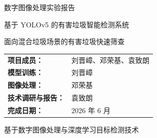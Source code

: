 \documentclass[UTF8,a4paper,12pt]{ctexart}
\begin{document}
\begin{titlepage}
  \centering
  \vspace*{2.2cm}
  {\heiti{} 数字图像处理实验报告\par}
  \vspace{1.1cm}
  {\heiti{} 基于 YOLOv5 的有害垃圾智能检测系统\par}
  \vspace{0.5cm}
  {\Large 面向混合垃圾场景的有害垃圾快速筛查\par}
  \vfill
  \renewcommand{\arraystretch}{1.8}
  \begin{tabular}{>{\bfseries}p{3.5cm}p{7cm}}
    项目成员： & 刘晋嶂、邓荣基、袁致朗 \\
    模型训练： & 刘晋嶂 \\
    图像处理： & 邓荣基 \\
    技术调研与报告： & 袁致朗 \\
    完成日期： & 2026 年 6 月 \\
  \end{tabular}
  \vfill
  {\large 基于数字图像处理与深度学习目标检测技术\par}
\end{titlepage}

\begin{abstract}
在生活垃圾收集、转运和分拣过程中，干电池、过期药品、药膏及其他具有毒性、腐蚀性或潜在环境危害的物品，可能被混入大量普通垃圾。若这些有害垃圾未在前端及时识别并分离，它们可能进入压缩、破碎、焚烧、填埋或资源化利用等后续环节，造成有害物质泄漏、设备污染和二次环境风险。与此同时，环卫工人面对的通常不是背景干净、摆放规则的单件垃圾，而是数量庞大、相互遮挡且外观复杂的混合垃圾，单纯依靠人工逐件检查效率低、劳动强度高，并可能增加直接接触风险。

本项目围绕上述现实问题，设计并实现了一套基于 YOLOv5s 的垃圾目标检测系统。系统首先使用数字图像处理流水线对上传图像进行尺寸归一化、Gaussian Blur 去噪、CLAHE 局部对比度增强及 Unsharp Masking 锐化，再由 YOLOv5s 对图像中的垃圾进行分类与定位。当检测结果中出现干电池、过期药品、药膏、充电宝和化妆品瓶等有害垃圾时，Web 前端会进行醒目提示。实验采用开源且已完成目标框标注的垃圾图像数据集进行迁移学习，最终模型在验证集上获得 Precision 0.5476、Recall 0.5506、mAP@0.5 0.5612 和 mAP@0.5:0.95 0.3408。结果表明，本项目实现了从图像预处理、模型训练到前端部署的完整流程，并初步验证了利用视觉检测技术辅助环卫人员快速筛查有害垃圾的可行性。

\noindent\textbf{关键词：} 有害垃圾；目标检测；YOLOv5；图像预处理；垃圾分类；环境保护
\end{abstract}
\end{document}
